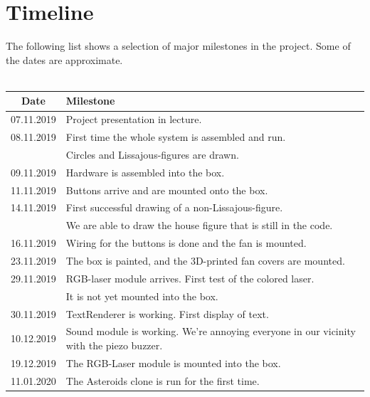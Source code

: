 \documentclass{report}
\begin{document}
\section{Timeline}
The following list shows a selection of major milestones in the project. Some of the dates are approximate. \\
\\
\begin{center}
	\begin{longtable}{c m{10cm}}
		Date & Milestone \\
		\hline
		\endhead
        07.11.2019 & Project presentation in lecture. \\
        08.11.2019 & First time the whole system is assembled and run. \\
		& Circles and Lissajous-figures are drawn.  \\
        09.11.2019 & Hardware is assembled into the box. \\
        11.11.2019 & Buttons arrive and are mounted onto the box. \\
        14.11.2019 & First successful drawing of a non-Lissajous-figure. \\
		& We are able to draw the house figure that is still in the code. \\
        16.11.2019 & Wiring for the buttons is done and the fan is mounted. \\
        23.11.2019 & The box is painted, and the 3D-printed fan covers are mounted. \\
        29.11.2019 & RGB-laser module arrives. First test of the colored laser. \\
		& It is not yet mounted into the box. \\
        30.11.2019 & TextRenderer is working. First display of text. \\
        10.12.2019 & Sound module is working. We're annoying everyone in our vicinity with the piezo buzzer. \\
        19.12.2019 & The RGB-Laser module is mounted into the box. \\
		11.01.2020 & The Asteroids clone is run for the first time. \\
	\end{longtable}
\end{center}
\end{document}
